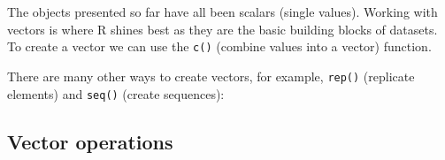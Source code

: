 \documentclass[letterpaperpaper,9pt,twocolumn,twoside,printwatermark=false]{pinp}
\begin{document}
The objects presented so far have all been scalars (single values).
Working with vectors is where R shines best as they are the basic
building blocks of datasets. To create a vector we can use the
\texttt{c()} (combine values into a vector) function.

\begin{Shaded}
\begin{Highlighting}[]
\StringTok{ }\NormalTok{(}\NormalTok{, }\NormalTok{, }\NormalTok{, }\NormalTok{, }\NormalTok{, }\NormalTok{)}
\StringTok{ }\NormalTok{(}\NormalTok{, }\NormalTok{, }\NormalTok{, }\NormalTok{)  }
\end{Highlighting}
\end{Shaded}

There are many other ways to create vectors, for example, \texttt{rep()}
(replicate elements) and \texttt{seq()} (create sequences):

\begin{Shaded}
\begin{Highlighting}[]
\StringTok{ }\NormalTok{(}\NormalTok{(}\NormalTok{, }\NormalTok{, }\NormalTok{, }\NormalTok{), }\NormalTok{)}
\StringTok{ }\NormalTok{(}\OperatorTok{-}\NormalTok{, }\NormalTok{, }\NormalTok{)}
\end{Highlighting}
\end{Shaded}

\hypertarget{vector-operations}{%
\subsection{Vector operations}\label{vector-operations}}
\end{document}
